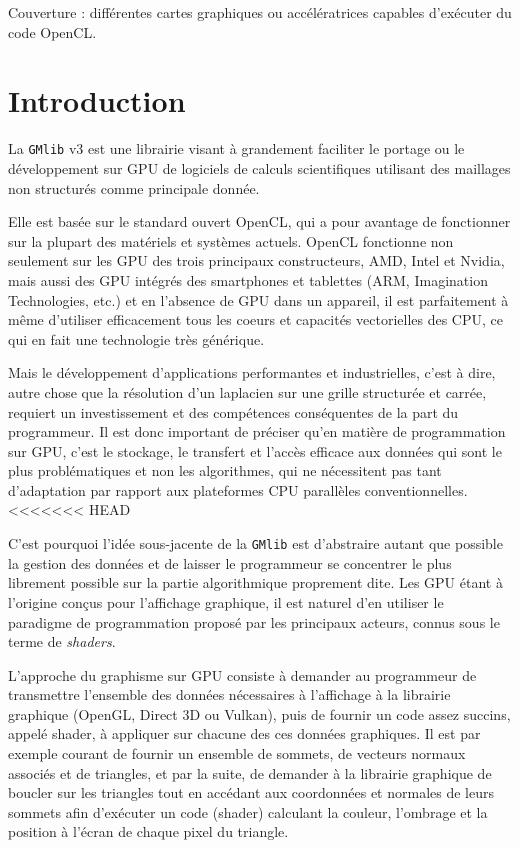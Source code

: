 \documentclass[a4paper,12pt]{article}
\begin{document}
\setcounter{tocdepth}{2}
\tableofcontents
\vfill

\footnotesize{Couverture : différentes cartes graphiques ou accélératrices capables d'exécuter du code OpenCL.}
\normalsize

\clearpage


%
%


\section{Introduction}
La {\tt GMlib} v3 est une librairie visant à grandement faciliter le portage ou le développement sur GPU de logiciels de calculs scientifiques utilisant des maillages non structurés comme principale donnée.

Elle est basée sur le standard ouvert OpenCL, qui a pour avantage de fonctionner sur la plupart des matériels et systèmes actuels.
OpenCL fonctionne non seulement sur les GPU des trois principaux constructeurs, AMD, Intel et Nvidia, mais aussi des GPU intégrés des smartphones et tablettes (ARM, Imagination Technologies, etc.) et en l'absence de GPU dans un appareil, il est parfaitement à même d'utiliser efficacement tous les coeurs et capacités vectorielles des CPU, ce qui en fait une technologie très générique.

Mais le développement d'applications performantes et industrielles, c'est à dire, autre chose que la résolution d'un laplacien sur une grille structurée et carrée, requiert un investissement et des compétences conséquentes de la part du programmeur.
Il est donc important de préciser qu'en matière de programmation sur GPU, c'est le stockage, le transfert et l'accès efficace aux données qui sont le plus problématiques et non les algorithmes, qui ne nécessitent pas tant d'adaptation par rapport aux plateformes CPU parallèles conventionnelles.
<<<<<<< HEAD

C'est pourquoi l'idée sous-jacente de la {\tt GMlib} est d'abstraire autant que possible la gestion des données et de laisser le programmeur se concentrer le plus librement possible sur la partie algorithmique proprement dite.
Les GPU étant à l'origine conçus pour l'affichage graphique, il est naturel d'en utiliser le paradigme de programmation proposé par les principaux acteurs, connus sous le terme de \emph{shaders}.

L'approche du graphisme sur GPU consiste à demander au programmeur de transmettre l'ensemble des données nécessaires à l'affichage à la librairie graphique (OpenGL, Direct 3D ou Vulkan), puis de fournir un code assez succins, appelé shader, à appliquer sur chacune des ces données graphiques.
Il est par exemple courant de fournir un ensemble de sommets, de vecteurs normaux associés et de triangles, et par la suite, de demander à la librairie graphique de boucler sur les triangles tout en accédant aux coordonnées et normales de leurs sommets afin d'exécuter un code (shader) calculant la couleur, l'ombrage et la position à l'écran de chaque pixel du triangle.
\end{document}

